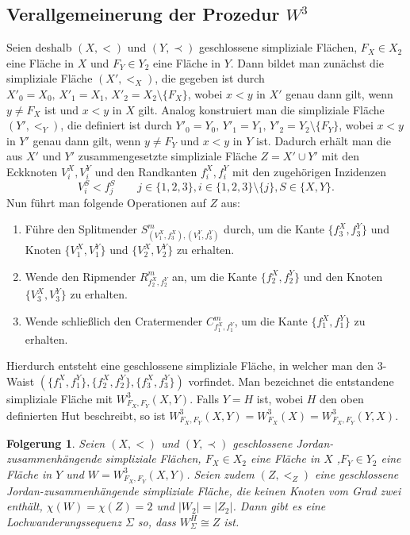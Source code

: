 \documentclass[12pt,titlepage,twoside,cleardoublepage]{article}
\theoremstyle{nummermitklammern}
\newtheorem{folgerung}[temp]{Folgerung}
\newtheorem{folgerung}[zahl]{Folgerung}
\numberwithin{equation}{section}
\begin{document}
\subsection{Verallgemeinerung der Prozedur $W^3$}
Seien deshalb $(X,<)$ und $(Y,\prec)$ geschlossene simpliziale Flächen, $F_X \in X_2$ eine Fläche in $X$ und $F_Y \in Y_2$ eine Fläche in $Y$. Dann bildet man zunächst die simpliziale Fläche $(X',<_X)$, die  gegeben ist durch $X'_0=X_0,\,X'_1=X_1,\,X'_2=X_2\setminus \{F_X\}$, wobei $x<y$ in $X'$ genau dann gilt, wenn $y\neq F_X$ ist und $x<y$ in $X$ gilt. Analog konstruiert man die simpliziale Fläche $(Y',<_Y)$, die definiert ist durch $Y'_0=Y_0,\,Y'_1=Y_1,\,Y'_2=Y_2\setminus \{F_Y\}$, wobei $x<y$ in $Y'$ genau dann gilt, wenn $y\neq F_Y$ und $x<y$ in $Y$ ist.
Dadurch erhält man die aus $X'$ und $Y'$ zusammengesetzte simpliziale Fläche $Z=X' \cup Y'$ mit den Eckknoten $V_i^{X},V_i^{Y}$ und den Randkanten $f_i^{X},f_i^{Y}$ mit den zugehörigen Inzidenzen 
\[
V^S_i < f^S_j \qquad j\in \{1,2,3\},i\in\{1,2,3\}\setminus \{j\}, S\in \{X,Y\}.
\]
Nun führt man folgende Operationen auf $Z$ aus:
\begin{enumerate}
\item Führe den Splitmender $S^m_{(V_1^X,f_3^X),(V_1^Y,f_3^Y)}$ durch, um die Kante $\{f_3^X,f_3^Y\}$ und Knoten $\{V_1^X,V_1^Y\}$ und $\{V_2^X,V_2^Y\}$ zu erhalten.
\item Wende den Ripmender $R^m_{f_2^X, f_2^Y}$ an, um die Kante $\{f_2^X ,f_2^Y\}$ und den Knoten $\{V_3^X,V_3^Y\}$ zu erhalten. 
\item Wende schließlich den Cratermender $C^m_{f_1^X,f_1^Y}$, um die Kante $\{f_1^X,f_1^Y\}$ zu erhalten.
\end{enumerate}
Hierdurch entsteht eine geschlossene simpliziale Fläche, in welcher man den 3-Waist $(\{f_1^X,f_1^Y\},\{f_2^X,f_2^Y\},\{f_3^X,f_3^Y\})$ vorfindet. Man bezeichnet die entstandene simpliziale Fläche mit $W^3_{F_X,F_Y}(X,Y)$. Falls $Y=H$ ist, wobei $H$ den oben definierten Hut beschreibt, so ist $W^3_{F_X,F_Y}(X,Y)=W^3_{F_X}(X)=W^3_{F_X,F_Y}(Y,X)$.
\begin{folgerung} 
Seien $(X,<)$ und $(Y, \prec)$ geschlossene Jordan-zusammenhängende simpliziale Flächen, $F_X\in X_2$ eine Fläche in $X$ ,$F_Y \in Y_2$ eine Fläche in $Y$ und $W=W_{F_X,F_Y}^3(X,Y)$. Seien zudem $(Z,<_Z)$ eine geschlossene Jordan-zusammenhängende simpliziale Fläche, die keinen Knoten vom Grad zwei enthält, $\chi(W)=\chi(Z)=2$ und $\vert W_2 \vert=\vert Z_2\vert $. Dann gibt es eine Lochwanderungssequenz $\Sigma$ so, dass $W_{\Sigma}^H \cong Z$ ist. 
\end{folgerung} 
\end{document}
